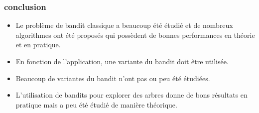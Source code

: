\documentclass{beamer}
\begin{document}
\begin{frame}
    \frametitle{conclusion}
    \begin{itemize}
        \item Le problème de bandit classique a beaucoup été étudié et de nombreux algorithmes ont été proposés qui possèdent de bonnes performances en théorie et en pratique.
        \item En fonction de l'application, une variante du bandit doit être utilisée. 
        \item Beaucoup de variantes du bandit n'ont pas ou peu été étudiées.
        \item L'utilisation de bandits pour explorer des arbres donne de bons résultats en pratique mais a peu été étudié de manière théorique.
    \end{itemize}
\end{frame}
\end{document}
